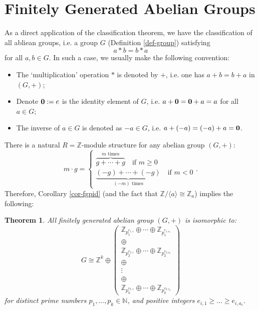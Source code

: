 \documentclass[11pt,openany]{book}
\theoremstyle{plain}
\newtheorem{theorem}{Theorem}[chapter]
\theoremstyle{definition}
\theoremstyle{remark}
\begin{document}
\section{Finitely Generated Abelian Groups}
As a direct application of the classification theorem, we have the classification of all abliean groups, i.e. a group $G$ (Definition \ref{def-group}) satisfying 
$$a \ast b = b \ast a$$
for all $a, b \in G$. In such a case, we usually make the following convention:
\begin{itemize}
    \item The `multiplication' operation $\ast$ is denoted by $+$, i.e. one has $a + b = b + a$ in $(G,+)$; 
    \item Denote ${\bf 0} := e$ is the identity element of $G$, i.e. $a + {\bf 0} = {\bf 0} + a = a$ for all $a \in G$;
    \item The inverse of $a \in G$ is denoted as $-a \in G$, i.e. $a + (-a) = (-a) + a = {\bf 0}$.
\end{itemize}

There is a natural $R=\mathbb{Z}$-module structure for any abelian group $(G,+)$:
$$m\cdot g = \begin{cases}
    \overbrace{g+\cdots+g}^{m\text{ times}}\quad\text{if }m\geq 0\\
    \underbrace{(-g)+\cdots+(-g)}_{(-m)\text{ times}}\quad\text{if }m<0
\end{cases}.$$
Therefore, Corollary \ref{cor-fgpid} (and the fact that $\mathbb{Z}/\langle a \rangle \cong \mathbb{Z}_{a}$) implies the following:
\begin{theorem}
    All finitely generated abelian group $(G,+)$ is isomorphic to:
$$G \cong \mathbb{Z}^k \oplus \begin{pmatrix} \mathbb{Z}_{p_1^{e_{1,1}}} \oplus \cdots \oplus \mathbb{Z}_{p_1^{e_{1,a_1}}}\\ 
\oplus \\
\mathbb{Z}_{p_2^{e_{2,1}}} \oplus \cdots \oplus \mathbb{Z}_{p_2^{e_{2,a_2}}}\\
\oplus \\
\vdots \\
\oplus \\
\mathbb{Z}_{p_k^{e_{k,1}}} \oplus \cdots \oplus \mathbb{Z}_{p_k^{e_{k,a_k}}} \end{pmatrix}$$
for distinct prime numbers $p_1, \dots, p_k \in \mathbb{N}$, and positive integers $e_{i,1} \geq \dots \geq e_{i,a_i}$.
\end{theorem}
\end{document}
